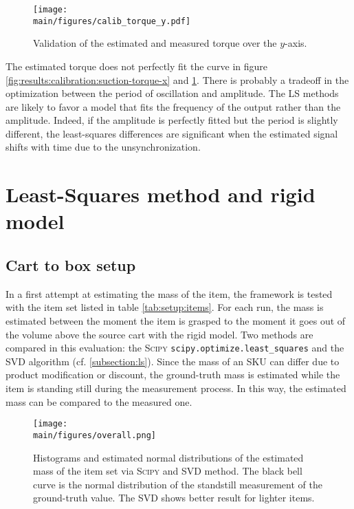 \documentclass[/home/francois/latex/report/main.tex]{subfiles}
\begin{document}
\begin{figure}[h]
  \centering
  \texttt{[image: \\main/figures/calib\_torque\_y.pdf]}
  \caption{Validation of the estimated and measured torque over the $y$-axis.}
  \label{fig:results:calibration:suction-torque-y}
\end{figure}

The estimated torque does not perfectly fit the curve in figure \ref{fig:results:calibration:suction-torque-x} and \ref{fig:results:calibration:suction-torque-y}. There is probably a tradeoff in the optimization between the period of oscillation and amplitude. The \ac{LS} methods are likely to favor a model that fits the frequency of the output rather than the amplitude. Indeed, if the amplitude is perfectly fitted but the period is slightly different, the least-squares differences are significant when the estimated signal shifts with time due to the unsynchronization.

\section{Least-Squares method and rigid model}

\subsection{Cart to box setup}

In a first attempt at estimating the mass of the item, the framework is tested with the item set listed in table \ref{tab:setup:items}. For each run, the mass is estimated between the moment the item is grasped to the moment it goes out of the volume above the source cart with the rigid model. Two methods are compared in this evaluation: the \textsc{Scipy} \texttt{scipy.optimize.least\_squares} and the \ac{SVD} algorithm (cf. \ref{subsection:ls}). Since the mass of an \ac{SKU} can differ due to product modification or discount, the ground-truth mass is estimated while the item is standing still during the measurement process. In this way, the estimated mass can be compared to the measured one.

\begin{figure}[H]
  \centering
  \texttt{[image: \\main/figures/overall.png]}
  \caption{Histograms and estimated normal distributions of the estimated mass of the item set via \textsc{Scipy} and \ac{SVD} method. The black bell curve is the normal distribution of the standstill measurement of the ground-truth value. The \ac{SVD} shows better result for lighter items.}
  \label{fig:results:rigid-ls}
\end{figure}
\end{document}
